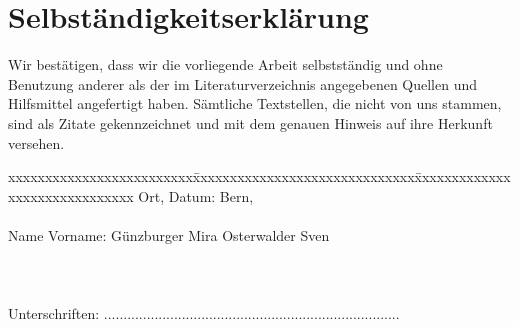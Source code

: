 \chapter*{Selbständigkeitserklärung}
\label{chap:selbstaendigkeitserklaerung}

\vspace*{10mm} 

Wir bestätigen, dass wir die vorliegende Arbeit selbstständig und ohne Benutzung anderer als der im Literaturverzeichnis angegebenen Quellen und Hilfsmittel angefertigt haben. Sämtliche Textstellen, die nicht von uns stammen, sind als Zitate gekennzeichnet und mit dem genauen Hinweis auf ihre Herkunft versehen. 

\vspace{15mm}

\begin{tabbing}
xxxxxxxxxxxxxxxxxxxxxxxxx\=xxxxxxxxxxxxxxxxxxxxxxxxxxxxxx\=xxxxxxxxxxxxxxxxxxxxxxxxxxxxxx\kill
Ort, Datum:		\> Bern, \versiondate \\ \\ 
Name Vorname:	\> Günzburger Mira 	\> Osterwalder Sven\\ \\ \\ \\ 
Unterschriften:	\>......................................\>......................................\\
\end{tabbing}
